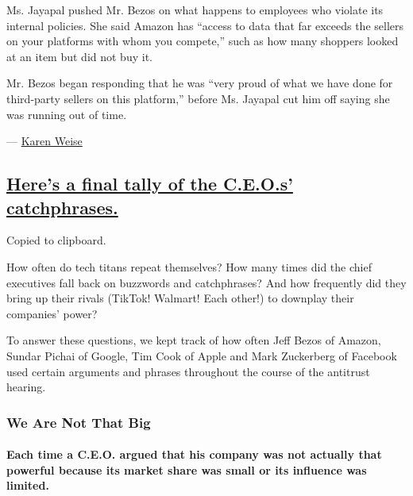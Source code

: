 Ms. Jayapal pushed Mr. Bezos on what happens to employees who violate
its internal policies. She said Amazon has ``access to data that far
exceeds the sellers on your platforms with whom you compete,'' such as
how many shoppers looked at an item but did not buy it.

Mr. Bezos began responding that he was ``very proud of what we have done
for third-party sellers on this platform,'' before Ms. Jayapal cut him
off saying she was running out of time.

--- \href{https://www.nytimes.com/by/karen-weise}{Karen Weise}

\hypertarget{heres-a-final-tally-of-the-ceos-catchphrases}{%
\subsection{\texorpdfstring{\protect\hyperlink{what-ceos-said}{Here's a
final tally of the C.E.O.s'
catchphrases.}}{Here's a final tally of the C.E.O.s' catchphrases.}}\label{heres-a-final-tally-of-the-ceos-catchphrases}}

Copied to clipboard.

How often do tech titans repeat themselves? How many times did the chief
executives fall back on buzzwords and catchphrases? And how frequently
did they bring up their rivals (TikTok! Walmart! Each other!) to
downplay their companies' power?

To answer these questions, we kept track of how often Jeff Bezos of
Amazon, Sundar Pichai of Google, Tim Cook of Apple and Mark Zuckerberg
of Facebook used certain arguments and phrases throughout the course of
the antitrust hearing.

\hypertarget{we-are-not-that-big}{%
\subsubsection{We Are Not That Big}\label{we-are-not-that-big}}

\hypertarget{each-time-a-ceo-argued-that-his-company-was-not-actually-that-powerful-because-its-market-share-was-small-or-its-influence-was-limited}{%
\paragraph{Each time a C.E.O. argued that his company was not actually
that powerful because its market share was small or its influence was
limited.}\label{each-time-a-ceo-argued-that-his-company-was-not-actually-that-powerful-because-its-market-share-was-small-or-its-influence-was-limited}}

